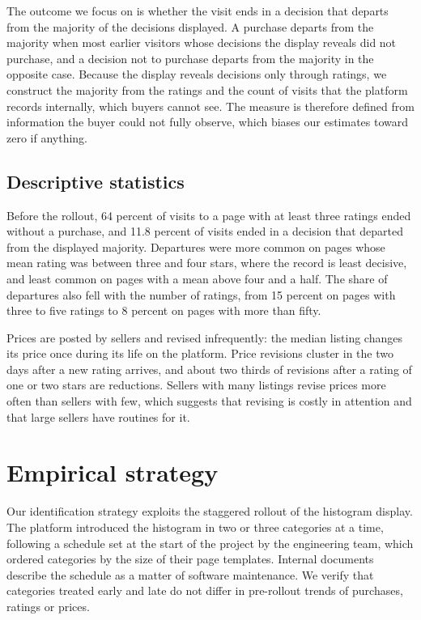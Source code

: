 \documentclass[12pt]{article}
\begin{document}
The outcome we focus on is whether the visit ends in a decision that departs from the majority of the decisions displayed. A purchase departs from the majority when most earlier visitors whose decisions the display reveals did not purchase, and a decision not to purchase departs from the majority in the opposite case. Because the display reveals decisions only through ratings, we construct the majority from the ratings and the count of visits that the platform records internally, which buyers cannot see. The measure is therefore defined from information the buyer could not fully observe, which biases our estimates toward zero if anything.

\subsection{Descriptive statistics}
Before the rollout, 64 percent of visits to a page with at least three ratings ended without a purchase, and 11.8 percent of visits ended in a decision that departed from the displayed majority. Departures were more common on pages whose mean rating was between three and four stars, where the record is least decisive, and least common on pages with a mean above four and a half. The share of departures also fell with the number of ratings, from 15 percent on pages with three to five ratings to 8 percent on pages with more than fifty.

Prices are posted by sellers and revised infrequently: the median listing changes its price once during its life on the platform. Price revisions cluster in the two days after a new rating arrives, and about two thirds of revisions after a rating of one or two stars are reductions. Sellers with many listings revise prices more often than sellers with few, which suggests that revising is costly in attention and that large sellers have routines for it.

\section{Empirical strategy}
Our identification strategy exploits the staggered rollout of the histogram display. The platform introduced the histogram in two or three categories at a time, following a schedule set at the start of the project by the engineering team, which ordered categories by the size of their page templates. Internal documents describe the schedule as a matter of software maintenance. We verify that categories treated early and late do not differ in pre-rollout trends of purchases, ratings or prices.
\end{document}
